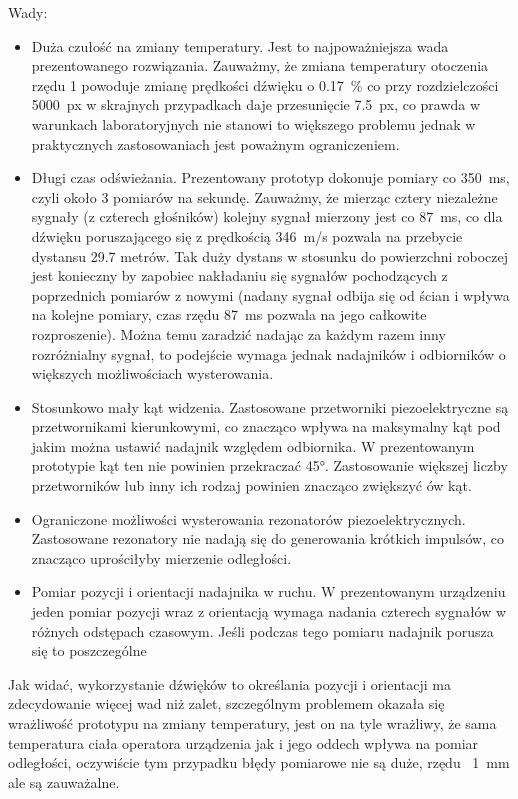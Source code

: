 Wady:
\begin{itemize}
 \item Duża czułość na zmiany temperatury. Jest to najpoważniejsza wada prezentowanego rozwiązania.
 Zauważmy, że zmiana temperatury otoczenia rzędu \SI{1}{\degC} powoduje zmianę prędkości dźwięku o \SI{0,17}{\%} 
 co przy rozdzielczości \SI{5000}{px} w skrajnych przypadkach daje przesunięcie \SI{7.5}{px},
 co prawda w warunkach laboratoryjnych nie stanowi to większego problemu jednak w praktycznych zastosowaniach
 jest poważnym ograniczeniem.
 
 \item Długi czas odświeżania. Prezentowany prototyp dokonuje pomiary co \SI{350}{ms}, czyli około 3 pomiarów 
 na sekundę. Zauważmy, że mierząc cztery niezależne sygnały (z czterech głośników) kolejny sygnał mierzony jest co \SI{87}{ms},
 co dla dźwięku poruszającego się z prędkością \SI{346}{m/s} pozwala na przebycie dystansu 29.7 metrów.
 Tak duży dystans w stosunku do powierzchni roboczej jest konieczny by zapobiec nakładaniu się sygnałów pochodzących z poprzednich
 pomiarów z nowymi (nadany sygnał odbija się od ścian i wpływa na kolejne pomiary, czas rzędu \SI{87}{ms} pozwala 
 na jego całkowite rozproszenie).
 Można temu zaradzić nadając za każdym razem inny rozróżnialny sygnał, to podejście 
 wymaga jednak nadajników i odbiorników o większych możliwościach wysterowania.
 
 \item Stosunkowo mały kąt widzenia. Zastosowane przetworniki piezoelektryczne są przetwornikami kierunkowymi, co 
 znacząco wpływa na maksymalny kąt pod jakim można ustawić nadajnik względem odbiornika. W prezentowanym 
 prototypie kąt ten nie powinien przekraczać \ang{45}. Zastosowanie większej liczby przetworników lub inny ich rodzaj
 powinien znacząco zwiększyć ów kąt.

 \item Ograniczone możliwości wysterowania rezonatorów piezoelektrycznych. 
 Zastosowane rezonatory nie nadają się do generowania krótkich impulsów, co znacząco uprościłyby mierzenie odległości.
 
 \item Pomiar pozycji i orientacji nadajnika w ruchu. W prezentowanym urządzeniu jeden pomiar pozycji wraz z orientacją wymaga 
 nadania czterech sygnałów w różnych odstępach czasowym. Jeśli podczas tego pomiaru nadajnik porusza się to 
 poszczególne 
\end{itemize}

Jak widać, wykorzystanie dźwięków to określania pozycji i orientacji ma zdecydowanie więcej wad niż zalet,
szczególnym problemem okazała się wrażliwość prototypu na zmiany temperatury, jest on na tyle wrażliwy, że 
sama temperatura ciała operatora urządzenia jak i jego oddech wpływa na pomiar odległości, oczywiście tym przypadku błędy pomiarowe
nie są duże, rzędu ~\SI{1}{mm} ale są zauważalne.

